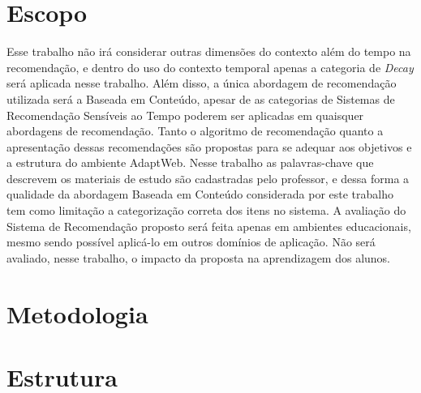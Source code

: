 \section{Escopo}

Esse trabalho não irá considerar outras dimensões do contexto além do tempo na recomendação, e dentro do uso do contexto
temporal apenas a categoria de \textit{Decay} será aplicada nesse trabalho. Além disso, a única abordagem de recomendação
utilizada será a Baseada em Conteúdo, apesar de as categorias de Sistemas de Recomendação Sensíveis ao Tempo poderem ser
aplicadas em quaisquer abordagens de recomendação. Tanto o algoritmo de recomendação quanto a apresentação dessas
recomendações são propostas para se adequar aos objetivos e a estrutura do ambiente AdaptWeb\textsuperscript{\textregistered}.
Nesse trabalho as palavras-chave que descrevem os materiais de estudo são cadastradas pelo professor, e dessa forma a
qualidade da abordagem Baseada em Conteúdo considerada por este trabalho tem como limitação a categorização correta dos
itens no sistema. A avaliação do Sistema de Recomendação proposto será feita apenas em ambientes educacionais, mesmo sendo
possível aplicá-lo em outros domínios de aplicação. Não será avaliado, nesse trabalho, o impacto da proposta na aprendizagem
dos alunos.

\section{Metodologia}

\section{Estrutura}



